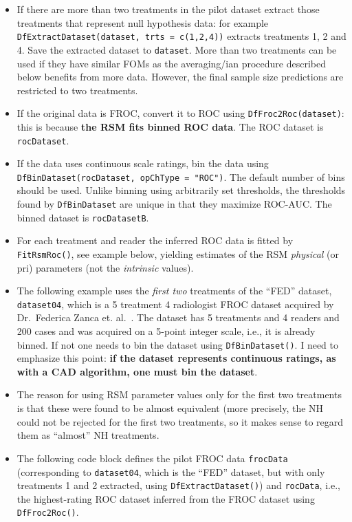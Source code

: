 \documentclass[
]{book}
\begin{document}
\begin{itemize}
\item
  If there are more than two treatments in the pilot dataset extract those treatments that represent null hypothesis data: for example \texttt{DfExtractDataset(dataset,\ trts\ =\ c(1,2,4))} extracts treatments 1, 2 and 4. Save the extracted dataset to \texttt{dataset}. More than two treatments can be used if they have similar FOMs as the averaging/ian procedure described below benefits from more data. However, the final sample size predictions are restricted to two treatments.
\item
  If the original data is FROC, convert it to ROC using \texttt{DfFroc2Roc(dataset)}: this is because \textbf{the RSM fits binned ROC data}. The ROC dataset is \texttt{rocDataset}.
\item
  If the data uses continuous scale ratings, bin the data using \texttt{DfBinDataset(rocDataset,\ opChType\ =\ "ROC")}. The default number of bins should be used. Unlike binning using arbitrarily set thresholds, the thresholds found by \texttt{DfBinDataset} are unique in that they maximize ROC-AUC. The binned dataset is \texttt{rocDatasetB}.
\item
  For each treatment and reader the inferred ROC data is fitted by \texttt{FitRsmRoc()}, see example below, yielding estimates of the RSM \emph{physical} (or pri) parameters (not the \emph{intrinsic} values).
\item
  The following example uses the \emph{first two} treatments of the ``FED'' dataset, \texttt{dataset04}, which is a 5 treatment 4 radiologist FROC dataset acquired by Dr.~Federica Zanca et. al.~\citep{RN1882}. The dataset has 5 treatments and 4 readers and 200 cases and was acquired on a 5-point integer scale, i.e., it is already binned. If not one needs to bin the dataset using \texttt{DfBinDataset()}. I need to emphasize this point: \textbf{if the dataset represents continuous ratings, as with a CAD algorithm, one must bin the dataset}.
\item
  The reason for using RSM parameter values only for the first two treatments is that these were found \citep{RN1882} to be almost equivalent (more precisely, the NH could not be rejected for the first two treatments, so it makes sense to regard them as ``almost'' NH treatments.
\item
  The following code block defines the pilot FROC data \texttt{frocData} (corresponding to \texttt{dataset04}, which is the ``FED'' dataset, but with only treatments 1 and 2 extracted, using \texttt{DfExtractDataset()}) and \texttt{rocData}, i.e., the highest-rating ROC dataset inferred from the FROC dataset using \texttt{DfFroc2Roc()}.
\end{itemize}
\end{document}
